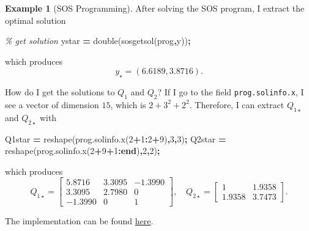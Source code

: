 \documentclass[
]{book}
\newenvironment{Shaded}{\begin{snugshade}}{\end{snugshade}}
\newcommand{\CommentTok}[1]{\textcolor[rgb]{0.56,0.35,0.01}{\textit{#1}}}
\newcommand{\FloatTok}[1]{\textcolor[rgb]{0.00,0.00,0.81}{#1}}
\newcommand{\KeywordTok}[1]{\textcolor[rgb]{0.13,0.29,0.53}{\textbf{#1}}}
\newcommand{\NormalTok}[1]{#1}
\newcommand{\OperatorTok}[1]{\textcolor[rgb]{0.81,0.36,0.00}{\textbf{#1}}}
\newcommand{\VariableTok}[1]{\textcolor[rgb]{0.00,0.00,0.00}{#1}}
\theoremstyle{definition}
\theoremstyle{definition}
\newtheorem{example}{Example}[chapter]
\theoremstyle{definition}
\theoremstyle{definition}
\theoremstyle{remark}
\begin{document}
\begin{example}[SOS Programming]
After solving the SOS program, I extract the optimal solution

\begin{Shaded}
\begin{Highlighting}[]
\CommentTok{\% get solution}
\VariableTok{ystar} \OperatorTok{=} \VariableTok{double}\NormalTok{(}\VariableTok{sosgetsol}\NormalTok{(}\VariableTok{prog}\OperatorTok{,}\VariableTok{y}\NormalTok{))}\OperatorTok{;}
\end{Highlighting}
\end{Shaded}

which produces
\[
y_{\star} = (6.6189, 3.8716).
\]

How do I get the solutions to \(Q_1\) and \(Q_2\)? If I go to the field \texttt{prog.solinfo.x}, I see a vector of dimension \(15\), which is \(2 + 3^2 + 2^2\). Therefore, I can extract \(Q_{1\star}\) and \(Q_{2\star}\) with

\begin{Shaded}
\begin{Highlighting}[]
\VariableTok{Q1star} \OperatorTok{=} \VariableTok{reshape}\NormalTok{(}\VariableTok{prog}\NormalTok{.}\VariableTok{solinfo}\NormalTok{.}\VariableTok{x}\NormalTok{(}\FloatTok{2}\OperatorTok{+}\FloatTok{1}\OperatorTok{:}\FloatTok{2}\OperatorTok{+}\FloatTok{9}\NormalTok{)}\OperatorTok{,}\FloatTok{3}\OperatorTok{,}\FloatTok{3}\NormalTok{)}\OperatorTok{;}
\VariableTok{Q2star} \OperatorTok{=} \VariableTok{reshape}\NormalTok{(}\VariableTok{prog}\NormalTok{.}\VariableTok{solinfo}\NormalTok{.}\VariableTok{x}\NormalTok{(}\FloatTok{2}\OperatorTok{+}\FloatTok{9}\OperatorTok{+}\FloatTok{1}\OperatorTok{:}\KeywordTok{end}\NormalTok{)}\OperatorTok{,}\FloatTok{2}\OperatorTok{,}\FloatTok{2}\NormalTok{)}\OperatorTok{;}
\end{Highlighting}
\end{Shaded}

which produces
\[
Q_{1\star} = \begin{bmatrix} 5.8716 & 3.3095 & -1.3990 \\
3.3095 & 2.7980 & 0 \\-1.3990 & 0 & 1 \end{bmatrix}, \quad 
Q_{2\star} = \begin{bmatrix} 1 & 1.9358 \\ 1.9358 & 3.7473 \end{bmatrix}.
\]

The implementation can be found \href{https://github.com/ComputationalRobotics/Semidefinite-Examples/blob/main/sos_program_example_sostools.m}{here}.


\end{example}
\end{document}
